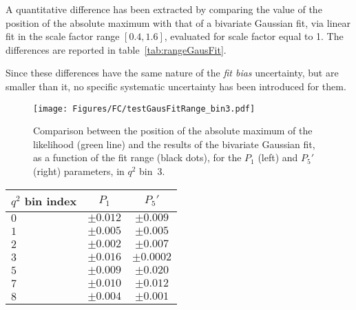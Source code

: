 A quantitative difference has been extracted by comparing the value of the position of the absolute maximum with that of a bivariate Gaussian fit, via linear fit in the scale factor range $[0.4,1.6]$, evaluated for scale factor equal to 1.
The differences are reported in table~\ref{tab:rangeGausFit}.

Since these differences have the same nature of the \textit{fit bias} uncertainty, but are smaller than it, no specific systematic uncertainty has been introduced for them. 

\begin{figure}
  \centering
  \texttt{[image: Figures/FC/testGausFitRange\_bin3.pdf]}
  \caption{Comparison between the position of the absolute maximum of the likelihood (green line) and the results of the bivariate Gaussian fit, as a function of the fit range (black dots), for the $P_1$ (left) and $P_5'$ (right) parameters, in $q^2$ bin~3.
  }
  \label{fig:gausFitRange}
\end{figure}

\begin{table*}[!htb]
  \begin {center}
    \begin{small}
      \caption{Systematic uncertainties: bias from bivariate Gaussian fit to the likelihood.
        \label{tab:rangeGausFit}}
      \begin{tabular}{l|cc}
        \hline
        $q^2$ bin index   & $P_1$ & $P_5'$ \\
        \hline
        $ 0 $    &   $\pm0.012$ & $\pm0.009 $   \\
        $ 1 $    &   $\pm0.005$ & $\pm0.005 $   \\
        $ 2 $    &   $\pm0.002$ & $\pm0.007 $   \\
        $ 3 $    &   $\pm0.016$ & $\pm0.0002$   \\
        $ 5 $    &   $\pm0.009$ & $\pm0.020 $   \\
        $ 7 $    &   $\pm0.010$ & $\pm0.012 $   \\
        $ 8 $    &   $\pm0.004$ & $\pm0.001 $   \\
        \hline
      \end{tabular}
    \end{small}
  \end{center}
\end{table*}

